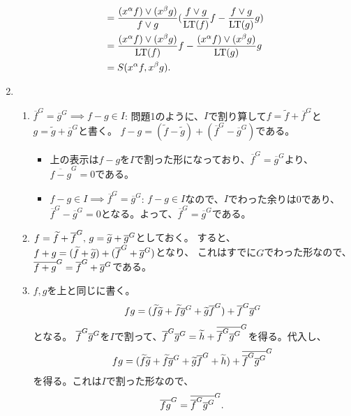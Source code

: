 \documentclass[9pt]{ltjsarticle}
\begin{document}
\begin{enumerate}[label=(問題 \arabic*)]
\begin{align}
    &=
    \frac{(x^\alpha f)\vee (x^\beta g)}{f \vee g} (\frac{f\vee g}{{\rm LT}(f)}f - \frac{f\vee g}{{\rm LT}(g)}g)\\
    &=
    \frac{(x^\alpha f)\vee(x^\beta g)}{{\rm LT}(f)}f - \frac{(x^\alpha f)\vee (x^\beta g)}{{\rm LT}(g)}g\\
    &=
    S(x^\alpha f, x^\beta g).
  \end{align}
  \item
  \begin{enumerate}[label=(\alph*)]
    \item
    $\overline f^G = \overline g^G \implies f-g\in I$:
    問題1のように、$I$で割り算して$f=\tilde f + \overline f^G$と
    $g=\tilde g + \overline g^G$と書く。
    $f-g = (\tilde f - \tilde g ) + (\overline f^G - \overline g^G)$である。
    \begin{itemize}
      \item
      上の表示は$f-g$を$I$で割った形になっており、$\overline f^G =\overline g^G$より、
      $\overline{f-g}^G = 0$である。
      \item $f-g\in I \implies \overline f^G = \overline g^G$:
      $f-g\in I$なので、$I$でわった余りは0であり、$\overline f^G - \overline g^G = 0$となる。よって、$\overline f^G = \overline g^G$である。
    \end{itemize}
    \item $f=\widetilde f + \overline{f}^{G},\, g=\widetilde g + \overline{g}^{G}$としておく。
    すると、$f+g = (\widetilde f + \widetilde g) + (\overline{f}^{G} + \overline{g}^{G})$となり、
    これはすでに$G$でわった形なので、$\overline{f+g}^{G} = \overline{f}^{G} + \overline{g}^{G}$である。
    \item
    $f,g$を上と同じに書く。
    \begin{align}
      fg = (\widetilde f \widetilde g + \widetilde f \overline{g}^{G} + \widetilde g \overline{f}^{G}) + \overline{f}^{G}\overline{g}^{G}
    \end{align}
    となる。
    $\overline{f}^{G}\overline{g}^{G}$を$I$で割って、$\overline{f}^{G}\overline{g}^{G} = \widetilde h + \overline{\overline{f}^{G}\overline{g}^{G}}^{G}$を得る。代入し、
    \begin{align}
      fg = (\widetilde f \widetilde g + \widetilde f \overline{g}^{G} + \widetilde g \overline{f}^{G} + \widetilde h) + \overline{\overline{f}^{G}\overline{g}^{G}}^{G}
    \end{align}
    を得る。これは$I$で割った形なので、
    \begin{align}
      \overline{fg}^{G} = \overline{\overline{f}^{G} \overline{g}^{G}}^{G}.
    \end{align}
  \end{enumerate}
\end{enumerate}
\end{document}
